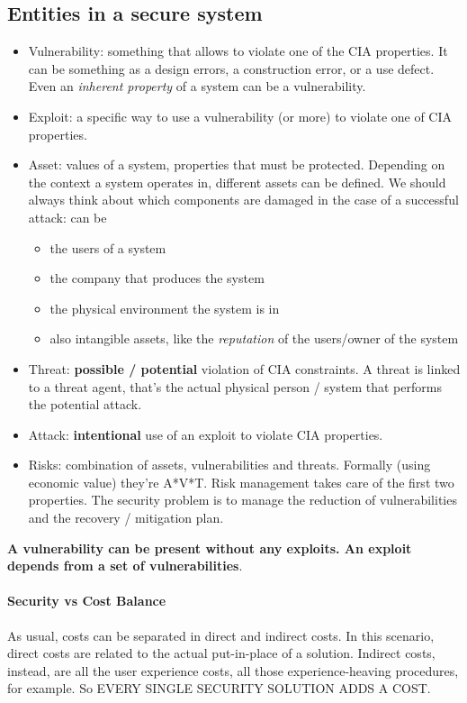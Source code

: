 \documentclass{article}
\begin{document}
			\subsection{Entities in a secure system}
				\begin{itemize}
					\item Vulnerability: something that allows to violate one of the CIA properties. It can be something as a design errors, a construction error, or a use defect. Even an \emph{inherent property} of a system can be a vulnerability.
					\item Exploit: a specific way to use a vulnerability (or more) to violate one of CIA properties.
					\item Asset: values of a system, properties that must be protected. Depending on the context a system operates in, different assets can be defined. We should always think about which components are damaged in the case of a successful attack: can be
						\begin{itemize}
							\item the users of a system
							\item the company that produces the system
							\item the physical environment the system is in
							\item also intangible assets, like the \emph{reputation} of the users/owner of the system
						\end{itemize}
					\item Threat: \textbf{possible / potential} violation of CIA constraints. A threat is linked to a threat agent, that's the actual physical person / system that performs the potential attack.
					\item Attack: \textbf{intentional} use of an exploit to violate CIA properties.
					\item Risks: combination of assets, vulnerabilities and threats. Formally (using economic value) they're A*V*T. Risk management takes care of the first two properties. The security problem is to manage the reduction of vulnerabilities and the recovery / mitigation plan. 
				\end{itemize}
				\textbf{A vulnerability can be present without any exploits. An exploit depends from a set of vulnerabilities}.\\
				
				\paragraph{Security vs Cost Balance}
					As usual, costs can be separated in direct and indirect costs. In this scenario, direct costs are related to the actual put-in-place of a solution. Indirect costs, instead, are all the user experience costs, all those experience-heaving procedures, for example. So EVERY SINGLE SECURITY SOLUTION ADDS A COST.
					
\end{document}
